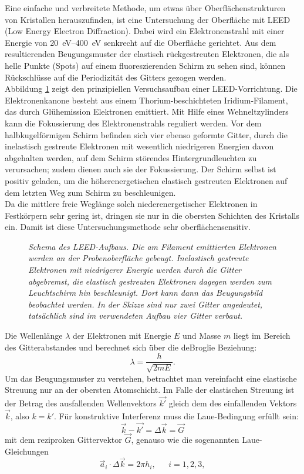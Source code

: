 \FloatBarrier

Eine einfache und verbreitete Methode, um etwas über Oberflächenstrukturen von
 Kristallen herauszufinden, ist eine Untersuchung der Oberfläche mit LEED (Low Energy Electron
 Diffraction).
 Dabei wird ein Elektronenstrahl mit einer Energie von \SIrange{20}{400}{eV} senkrecht auf die
 Oberfläche gerichtet. Aus dem resultierenden
 Beugungsmuster der elastisch rückgestreuten Elektronen, die als helle Punkte (Spots) auf einem 
 fluoreszierenden Schirm zu sehen sind, können Rückschlüsse auf die Periodizität des Gitters gezogen werden.\\
  Abbildung \ref{leedaufbau} zeigt den prinzipiellen Versuchsaufbau einer LEED-Vorrichtung. Die
 Elektronenkanone besteht aus einem Thorium-beschichteten Iridium-Filament, das durch Glühemission
 Elektronen emittiert. Mit Hilfe eines Wehneltzylinders kann die Fokussierung
 des Elektronenstrahls reguliert werden. Vor dem halbkugelförmigen Schirm befinden
 sich vier ebenso geformte Gitter, durch die inelastisch gestreute Elektronen mit wesentlich
 niedrigeren Energien davon abgehalten werden, auf dem Schirm störendes Hintergrundleuchten zu
 verursachen; zudem dienen auch sie der Fokussierung. Der Schirm selbst ist positiv geladen, um
 die höherenergetischen elastisch gestreuten Elektronen auf dem letzten Weg zum Schirm zu beschleunigen.\\
  Da die mittlere freie Weglänge solch niederenergetischer Elektronen in
 Festkörpern sehr gering ist, dringen sie nur in die obersten Schichten des
 Kristalls ein. Damit ist diese Untersuchungsmethode sehr oberflächensensitiv.

 \begin{figure}[htbp]
	\centering
	\sffamily 
	
	\caption{\textit{Schema des LEED-Aufbaus. Die am Filament emittierten Elektronen werden an der
	Probenoberfläche gebeugt. Inelastisch gestreute Elektronen mit niedrigerer Energie werden durch die
	Gitter abgebremst, die elastisch gestreuten Elektronen dagegen werden zum Leuchtschirm
	hin beschleunigt. Dort kann dann das Beugungsbild beobachtet werden. In der Skizze sind nur zwei
	Gitter angedeutet, tatsächlich sind im verwendeten Aufbau vier Gitter verbaut.}}
	\label{leedaufbau}
\end{figure}






 Die Wellenlänge $\lambda$ der Elektronen mit Energie $E$ und Masse $m$ liegt im Bereich des
 Gitterabstandes und berechnet sich über die deBroglie Beziehung:
 \[\lambda=\frac{h}{\sqrt{2mE}}.\]%
Um das Beugungsmuster zu verstehen, betrachtet man vereinfacht eine elastische
Streuung nur an der obersten Atomschicht. Im Falle der elastischen Streuung ist
der Betrag des ausfallenden Wellenvektors $\vec{k'}$ gleich dem des
einfallenden Vektors $\vec{k}$, also $k=k'$. Für konstruktive Interferenz
muss die Laue-Bedingung erfüllt sein:
\[\vec{k}-\vec{k'}=\Delta \vec{k}=\vec{G}\]
mit dem reziproken Gittervektor $\vec{G}$, genauso wie die sogenannten Laue-Gleichungen
\[\vec{a}_i\cdot \Delta \vec{k}=2\pi h_i,~~~~~~~i=1, 2, 3,\]

